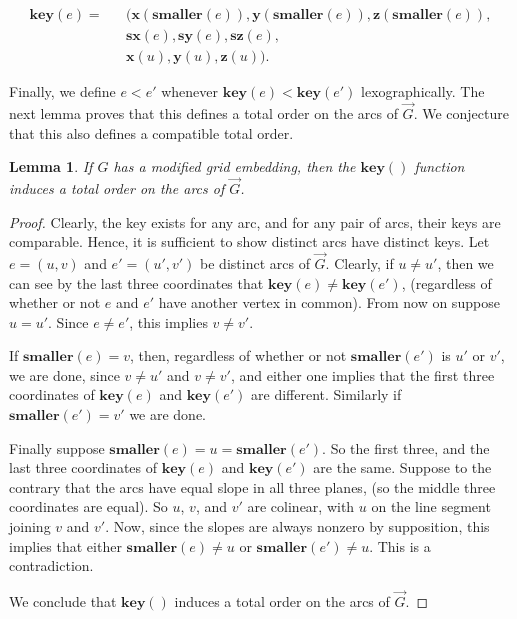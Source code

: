 \documentclass[12pt,letterpaper,oneside]{book}
\newcommand{\key}{\textbf{key}}
\newcommand{\closer}{\textbf{smaller}}
\newcommand{\smaller}{\textbf{smaller}}
\newcommand{\xcor}{\textbf{x}}
\newcommand{\ycor}{\textbf{y}}
\newcommand{\zcor}{\textbf{z}}
\newcommand{\sx}{\textbf{sx}}
\newcommand{\sy}{\textbf{sy}}
\newcommand{\sz}{\textbf{sz}}
\newtheorem{lemma}[theorem]{Lemma}
\begin{document}
\begin{eqnarray*}
\key(e) =& &(\xcor(\closer(e)),\ycor(\closer(e)),\zcor(\closer(e)),\\
& &\sx(e),\sy(e),\sz(e),\\
& &\xcor(u),\ycor(u),\zcor(u)).
\end{eqnarray*}

Finally, we define $e<e'$ whenever $\key(e)<\key(e')$ lexographically. 
The next lemma proves that this defines a total order on the arcs of $\vec{G}$.  We conjecture that this also defines a compatible total order.


\begin{lemma}
If $G$ has a modified grid embedding, then the $\key()$ function induces a total order on the arcs of $\vec{G}$.  
\end{lemma}
\begin{proof}

Clearly, the key exists for any arc, and for any pair of arcs, their keys are comparable.  Hence, it is sufficient 
to show distinct arcs have 
distinct keys.  Let $e = (u, v)$ and $e' = (u', v')$ be distinct arcs of $\vec{G}$.  Clearly, if $u \ne u'$,
then we can see by the last three coordinates that $\key(e) \ne \key(e')$, (regardless 
of whether or not $e$ and $e'$ have another vertex in common).  From now on suppose $u= u'$.  Since $e\ne e'$, this 
implies $v \ne v'$.  


If $\smaller(e) = v$, then, regardless of whether or not $\smaller(e')$ is $u'$ or $v'$, we are done, since $v\ne u'$ and $v\ne v'$, and 
either one implies that the first three coordinates of $\key(e)$ and $\key(e')$ are different.  Similarly if $\smaller(e')=v'$ we are done.  


Finally suppose $\smaller(e) = u = \smaller(e')$.  So the first three, and the last three coordinates of $\key(e)$ and $\key(e')$ are the same.  
Suppose to the contrary that the arcs have equal slope in all three planes, (so the middle three coordinates are equal).  So 
$u$, $v$, and $v'$ are colinear, with $u$ on the line segment joining $v$ and $v'$.  Now, 
since the slopes are always nonzero by supposition, this implies that either $\smaller(e)\ne u$ or $\smaller(e')\ne u$.  This is a contradiction.

We conclude that $\key()$ induces a total order on the arcs of $\vec{G}$.  



\end{proof}
\end{document}
